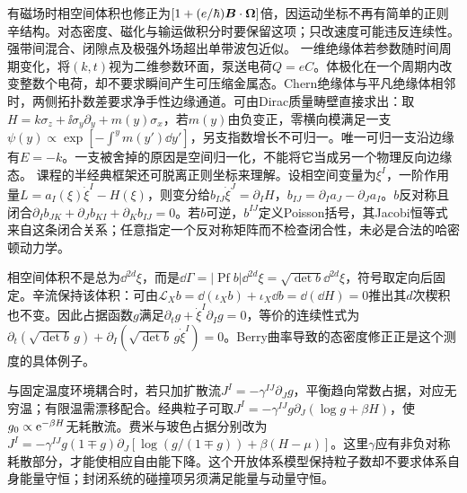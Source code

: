 有磁场时相空间体积也修正为$[1+(e/\hbar)\boldsymbol{B}\cdot\boldsymbol{\Omega}]$倍，因运动坐标不再有简单的正则辛结构。对态密度、磁化与输运做积分时要保留这项；只改速度可能违反连续性。强带间混合、闭隙点及极强外场超出单带波包近似。
一维绝缘体若参数随时间周期变化，将$(k,t)$视为二维参数环面，泵送电荷$Q=eC$。体极化在一个周期内改变整数个电荷，却不要求瞬间产生可压缩金属态。Chern绝缘体与平凡绝缘体相邻时，两侧拓扑数差要求净手性边缘通道。可由Dirac质量畴壁直接求出：取$H=k\sigma_z+\ii\sigma_y\partial_y+m(y)\sigma_x$，若$m(y)$由负变正，零横向模满足一支$\psi(y)\propto\exp[-\int^y m(y')\dd y']$，另支指数增长不可归一。唯一可归一支沿边缘有$E=-k$。一支被舍掉的原因是空间归一化，不能将它当成另一个物理反向边缘态。
课程的半经典框架还可脱离正则坐标来理解。设相空间变量为$\xi^I$，一阶作用量$L=a_I(\xi)\dot\xi^I-H(\xi)$，则变分给$b_{IJ}\dot\xi^J=\partial_IH$，$b_{IJ}=\partial_Ia_J-\partial_Ja_I$。$b$反对称且闭合$\partial_Ib_{JK}+\partial_Jb_{KI}+\partial_Kb_{IJ}=0$。若$b$可逆，$b^{IJ}$定义Poisson括号，其Jacobi恒等式来自这条闭合关系；任意指定一个反对称矩阵而不检查闭合性，未必是合法的哈密顿动力学。

相空间体积不是总为$\dd^{2d}\xi$，而是$\dd\Gamma=|\operatorname{Pf}b|\dd^{2d}\xi=\sqrt{\det b}\dd^{2d}\xi$，符号取定向后固定。辛流保持该体积：可由$\mathcal L_Xb=\dd(\iota_Xb)+\iota_X\dd b=\dd(\dd H)=0$推出其$d$次楔积也不变。因此占据函数$g$满足$\partial_tg+\dot\xi^I\partial_Ig=0$，等价的连续性式为$\partial_t(\sqrt{\det b}\,g)+\partial_I(\sqrt{\det b}\,g\dot\xi^I)=0$。Berry曲率导致的态密度修正正是这个测度的具体例子。

与固定温度环境耦合时，若只加扩散流$J^I=-\gamma^{IJ}\partial_Jg$，平衡趋向常数占据，对应无穷温；有限温需漂移配合。经典粒子可取$J^I=-\gamma^{IJ}g\partial_J(\log g+\beta H)$，使$g_0\propto\mathrm e^{-\beta H}$无耗散流。费米与玻色占据分别改为$J^I=-\gamma^{IJ}g(1\mp g)\partial_J[\log(g/(1\mp g))+\beta(H-\mu)]$。这里$\gamma$应有非负对称耗散部分，才能使相应自由能下降。这个开放体系模型保持粒子数却不要求体系自身能量守恒；封闭系统的碰撞项另须满足能量与动量守恒。
